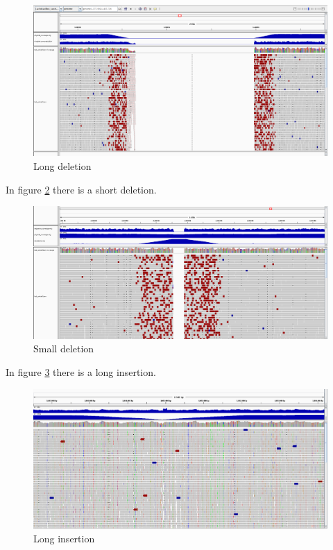 \begin{enumerate}
\begin{figure}[h]
  \centering
  \includegraphics[scale=0.2]{img/pairs}
  \caption{Long deletion}
  \label{fig:pairs}
\end{figure}

In figure \ref{fig:small_del} there is a short deletion.

\begin{figure}[h]
  \centering
  \includegraphics[scale=0.2]{img/small_del}
  \caption{Small deletion}
  \label{fig:small_del}
\end{figure}

In figure \ref{fig:long_insertion} there is a long insertion.

\begin{figure}[h]
  \centering
  \includegraphics[scale=0.2]{img/long_insertion}
  \caption{Long insertion}
  \label{fig:long_insertion}
\end{figure}

\end{enumerate}

